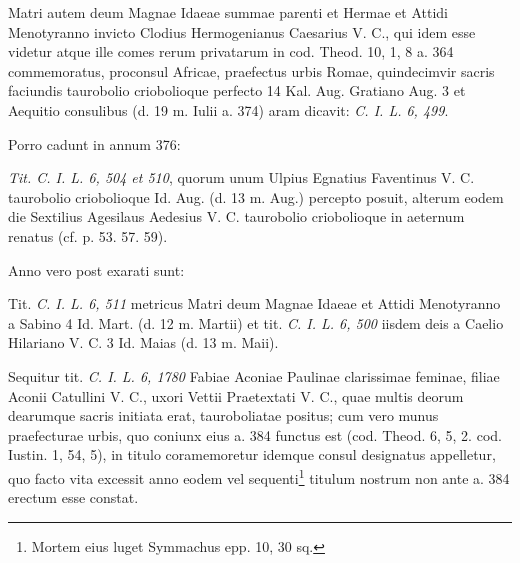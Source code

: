 \documentclass[a4paper, 11pt, oneside, polutonikogreek, german, twocolumn]{article}
\begin{document}
Matri autem deum Magnae Idaeae summae parenti et Hermae et Attidi Menotyranno invicto Clodius Hermogenianus Caesarius V. C., qui idem esse videtur atque ille comes rerum privatarum in cod. Theod. 10, 1, 8 a. 364 commemoratus, proconsul Africae, praefectus urbis Romae, quindecimvir sacris faciundis taurobolio criobolioque perfecto 14 Kal. Aug. Gratiano Aug. 3 et Aequitio consulibus (d. 19 m. Iulii a. 374) aram dicavit: \emph{C. I. L. 6, 499}.

Porro cadunt in annum 376:

\emph{Tit. C. I. L. 6, 504 et 510}, quorum unum Ulpius Egnatius Faventinus V. C. taurobolio criobolioque Id. Aug. (d. 13 m. Aug.) percepto posuit, alterum eodem die Sextilius Agesilaus Aedesius V. C. taurobolio criobolioque in aeternum renatus (cf. p. 53. 57. 59).

Anno vero post exarati sunt:

Tit. \emph{C. I. L. 6, 511} metricus Matri deum Magnae Idaeae et Attidi Menotyranno a Sabino 4 Id. Mart. (d. 12 m. Martii) et tit. \emph{C. I. L. 6, 500} iisdem deis a Caelio Hilariano V. C. 3 Id. Maias (d. 13 m. Maii).

Sequitur tit. \emph{C. I. L. 6, 1780} Fabiae Aconiae Paulinae clarissimae feminae, filiae Aconii Catullini V. C., uxori Vettii Praetextati V. C., quae multis deorum dearumque sacris initiata erat, tauroboliatae positus; cum vero munus praefecturae urbis, quo coniunx eius a. 384 functus est (cod. Theod. 6, 5, 2. cod. Iustin. 1, 54, 5), in titulo coramemoretur idemque consul designatus appelletur, quo facto vita excessit anno eodem vel sequenti\footnote{Mortem eius luget Symmachus epp. 10, 30 sq.} titulum nostrum non ante a. 384 erectum esse constat.
\end{document}
